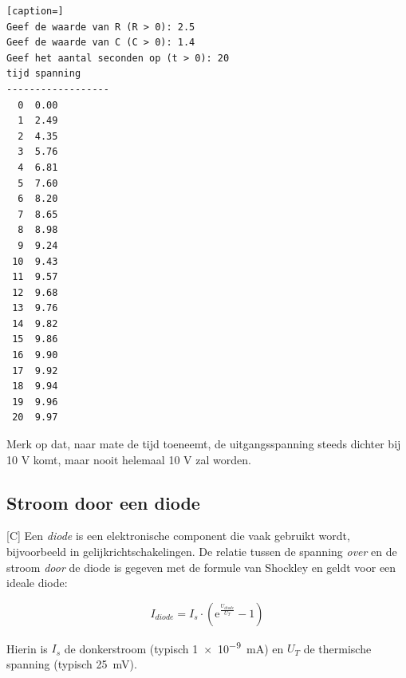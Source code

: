 \documentclass[a4paper,10pt,fleqn,twoside]{article}
\begin{document}
\begin{lstlisting}[caption=]
Geef de waarde van R (R > 0): 2.5
Geef de waarde van C (C > 0): 1.4
Geef het aantal seconden op (t > 0): 20
tijd spanning
------------------
  0  0.00
  1  2.49
  2  4.35
  3  5.76
  4  6.81
  5  7.60
  6  8.20
  7  8.65
  8  8.98
  9  9.24
 10  9.43
 11  9.57
 12  9.68
 13  9.76
 14  9.82
 15  9.86
 16  9.90
 17  9.92
 18  9.94
 19  9.96
 20  9.97
\end{lstlisting}

Merk op dat, naar mate de tijd toeneemt, de uitgangsspanning steeds dichter bij 10 V komt, maar nooit helemaal 10 V zal worden.

\subsection{Stroom door een diode}[C]
Een \textsl{diode} is een elektronische component die vaak gebruikt wordt, bijvoorbeeld in gelijkrichtschakelingen. De relatie tussen de spanning \textsl{over} en de stroom \textsl{door} de diode is gegeven met de formule van Shockley en geldt voor een ideale diode:

\begin{equation}
I_{diode} = I_s\cdot(\mathrm{e}^{\frac{U_{diode}}{U_T}}-1)
\end{equation}

Hierin is $I_s$ de donkerstroom (typisch \SI{1e-9}{\milli\ampere}) en $U_T$ de thermische spanning (typisch \SI{25}{\milli\volt}).


\begin{figure}[!ht]
\centering
{}
\end{figure}
\end{document}
